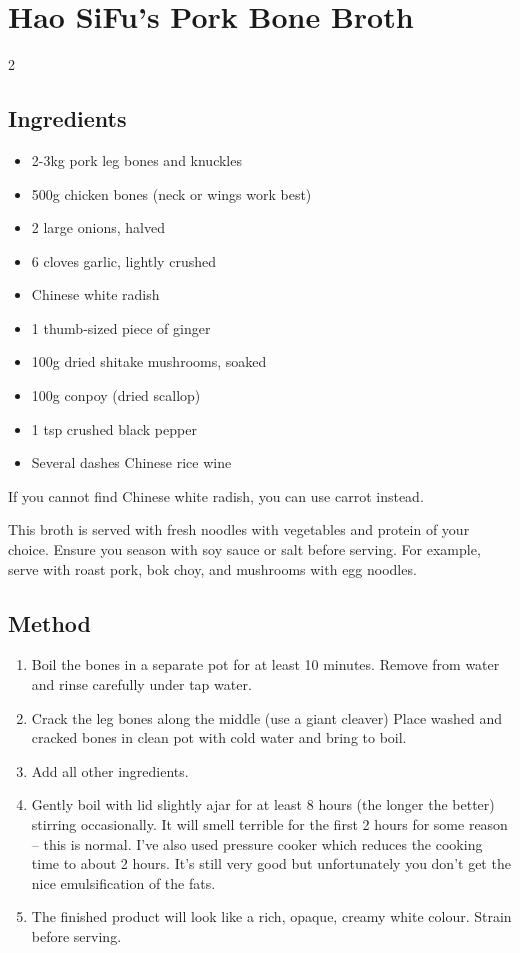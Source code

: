 \clearpage

\section{Hao SiFu's Pork Bone Broth}

\begin{multicols}{2}
    \subsection{Ingredients}

      \begin{itemize}
        \item 2-3kg pork leg bones and knuckles
        \item 500g chicken bones (neck or wings work best)
        \item 2 large onions, halved
        \item 6 cloves garlic, lightly crushed
        \item {} Chinese white radish
        \item 1 thumb-sized piece of ginger
        \item 100g dried shitake mushrooms, soaked
        \item 100g conpoy (dried scallop)
        \item 1 tsp crushed black pepper
        \item Several dashes Chinese rice wine
      \end{itemize}
      If you cannot find Chinese white radish, you can use carrot instead.

      This broth is served with fresh noodles with vegetables and protein of your choice. Ensure you season with soy sauce or salt before serving. For example, serve with roast pork, bok choy, and mushrooms with egg noodles.
    \vfill\null
    \columnbreak

    \subsection{Method}

    \begin{enumerate}
      \item Boil the bones in a separate pot for at least 10 minutes. Remove from water and rinse carefully under tap water.
      \item Crack the leg bones along the middle (use a giant cleaver) Place washed and cracked bones in clean pot with cold water and bring to boil.
      \item Add all other ingredients.
      \item Gently boil with lid slightly ajar for at least 8 hours (the longer the better) stirring occasionally. It will smell terrible for the first 2 hours for some reason – this is normal. I've also used pressure cooker which reduces the cooking time to about 2 hours. It's still very good but unfortunately you don't get the nice emulsification of the fats.
      \item The finished product will look like a rich, opaque, creamy white colour. Strain before serving.
    \end{enumerate}
\end{multicols}
